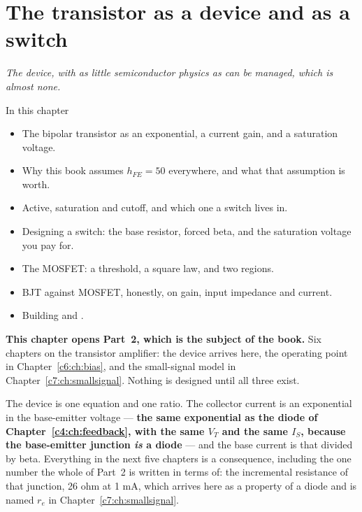 
\chapter{The transistor as a device and as a switch}
\label{c5:ch:transistor}

{\large\itshape The device, with as little semiconductor physics as can be managed, which is
almost none.\par}

\begin{chapterbox}{In this chapter}
\begin{itemize}
  \item The bipolar transistor as an exponential, a current gain, and a saturation voltage.
  \item Why this book assumes $h_{FE} = 50$ everywhere, and what that assumption is worth.
  \item Active, saturation and cutoff, and which one a switch lives in.
  \item Designing a switch: the base resistor, forced beta, and the saturation voltage you pay for.
  \item The MOSFET: a threshold, a square law, and two regions.
  \item BJT against MOSFET, honestly, on gain, input impedance and current.
  \item Building  and .
\end{itemize}
\end{chapterbox}

\textbf{This chapter opens Part~2, which is the subject of the book.} Six chapters on the
transistor amplifier: the device arrives here, the operating point in
Chapter~\ref{c6:ch:bias}, and the small-signal model in Chapter~\ref{c7:ch:smallsignal}. Nothing
is designed until all three exist.

The device is one equation and one ratio. The collector current is an exponential in the
base-emitter voltage --- \textbf{the same exponential as the diode of
Chapter~\ref{c4:ch:feedback}, with the same $V_T$ and the same $I_S$, because the base-emitter
junction \emph{is} a diode} --- and the base current is that divided by beta. Everything in the
next five chapters is a consequence, including the one number the whole of Part~2 is written in
terms of: the incremental resistance of that junction, 26 ohm at 1 mA, which arrives here as a
property of a diode and is named $r_e$ in Chapter~\ref{c7:ch:smallsignal}.

